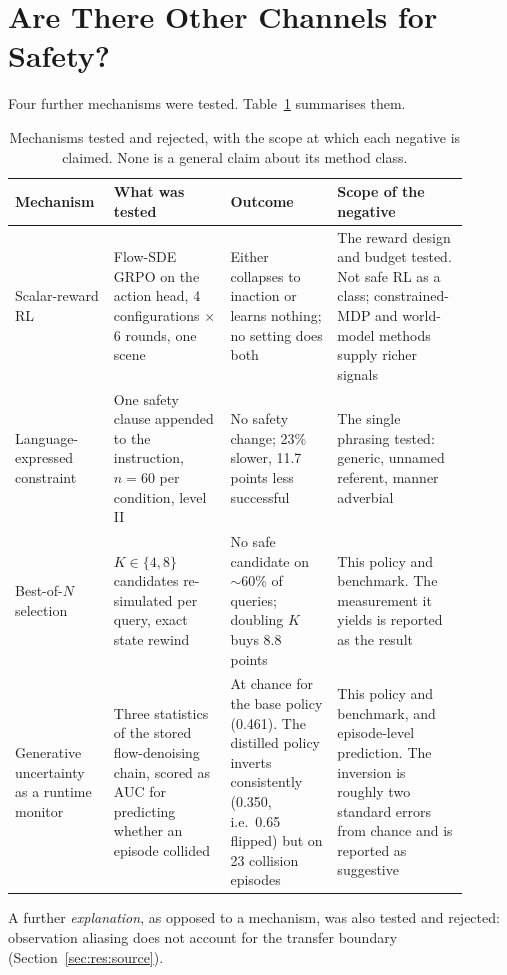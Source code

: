\section{Are There Other Channels for Safety?}\label{sec:res:channels}

Four further mechanisms were tested.
Table~\ref{tab:negatives} summarises them.

\begin{table}[htbp]
\centering
\begin{threeparttable}
\caption[Mechanisms tested and rejected]{%
  Mechanisms tested and rejected, with the scope at which each negative is claimed. None is a
  general claim about its method class.}
\label{tab:negatives}
\footnotesize
\begin{tabular}{p{0.17\linewidth}p{0.24\linewidth}p{0.22\linewidth}p{0.27\linewidth}}
\toprule
\textbf{Mechanism} & \textbf{What was tested} & \textbf{Outcome} & \textbf{Scope of the negative} \\
\midrule
Scalar-reward RL
  & Flow-SDE GRPO on the action head, 4 configurations $\times$ 6 rounds, one scene
  & Either collapses to inaction or learns nothing; no setting does both
  & The reward design and budget tested. Not safe RL as a class; constrained-MDP and
    world-model methods supply richer signals \\
\addlinespace[3pt]
Language-expressed constraint
  & One safety clause appended to the instruction, $n=60$ per condition, level II
  & No safety change; 23\% slower, 11.7 points less successful
  & The single phrasing tested: generic, unnamed referent, manner adverbial \\
\addlinespace[3pt]
Best-of-$N$ selection
  & $K \in \{4, 8\}$ candidates re-simulated per query, exact state rewind
  & No safe candidate on $\sim$60\% of queries; doubling $K$ buys 8.8 points
  & This policy and benchmark. The measurement it yields is reported as the result \\
\addlinespace[3pt]
Generative uncertainty as a runtime monitor
  & Three statistics of the stored flow-denoising chain, scored as AUC for predicting whether an
    episode collided
  & At chance for the base policy (0.461). The distilled policy inverts consistently
    (0.350, i.e.\ 0.65 flipped) but on 23 collision episodes
  & This policy and benchmark, and episode-level prediction. The inversion is roughly two standard
    errors from chance and is reported as suggestive \\
\bottomrule
\end{tabular}
\begin{tablenotes}[flushleft]\footnotesize
\item A further \emph{explanation}, as opposed to a mechanism, was also tested and rejected:
  observation aliasing does not account for the transfer boundary
  (Section~\ref{sec:res:source}).
\end{tablenotes}
\end{threeparttable}
\end{table}

